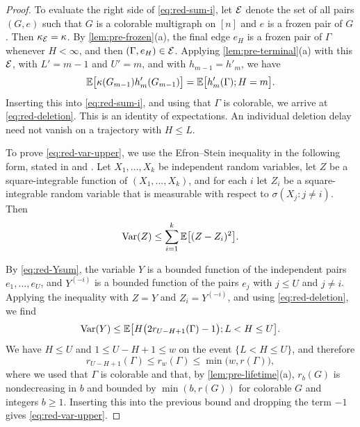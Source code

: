 \begin{proof}
To evaluate the right side of \eqref{eq:red-sum-i}, let $\mathcal E$ denote the set of all pairs $(G, e)$ such that $G$ is a colorable multigraph on $[n]$ and $e$ is a frozen pair of $G$. Then $\kappa_\mathcal E = \kappa$. By \cref{lem:pre-frozen}(a), the final edge $e_H$ is a frozen pair of $\Gamma$ whenever $H < \infty$, and then $(\Gamma, e_H) \in \mathcal E$. Applying \cref{lem:pre-terminal}(a) with this $\mathcal E$, with $L' = m - 1$ and $U' = m$, and with $h_{m - 1} = h'_m$, we have
\begin{equation*}
\mathbb E\bigl[\kappa(G_{m - 1}) h'_m(G_{m - 1})\bigr] = \mathbb E\bigl[h'_m(\Gamma); H = m\bigr].
\end{equation*}
Inserting this into \eqref{eq:red-sum-i}, and using that $\Gamma$ is colorable, we arrive at \eqref{eq:red-deletion}. This is an identity of expectations. An individual deletion delay need not vanish on a trajectory with $H \le L$.

To prove \eqref{eq:red-var-upper}, we use the Efron--Stein inequality \cite{efron1981jackknife,steele1986efron} in the following form, stated in \cite[(3.6)]{boucheron2005moment} and \cite[Theorem~3.1]{boucheron2013concentration}. Let $X_1, \dots, X_k$ be independent random variables, let $Z$ be a square-integrable function of $(X_1, \dots, X_k)$, and for each $i$ let $Z_i$ be a square-integrable random variable that is measurable with respect to $\sigma(X_j : j \ne i)$. Then
\begin{equation*}
\operatorname{Var}(Z) \le \sum_{i = 1}^{k} \mathbb E\bigl[(Z - Z_i)^2\bigr].
\end{equation*}

By \eqref{eq:red-Ysum}, the variable $Y$ is a bounded function of the independent pairs $e_1, \dots, e_U$, and $Y^{(-i)}$ is a bounded function of the pairs $e_j$ with $j \le U$ and $j \ne i$. Applying the inequality with $Z = Y$ and $Z_i = Y^{(-i)}$, and using \eqref{eq:red-deletion}, we find
\begin{equation*}
\operatorname{Var}(Y) \le \mathbb E\bigl[H \bigl(2 r_{U - H + 1}(\Gamma) - 1\bigr); L < H \le U\bigr].
\end{equation*}
We have $H \le U$ and $1 \le U - H + 1 \le w$ on the event $\{L < H \le U\}$, and therefore
\begin{equation*}
r_{U - H + 1}(\Gamma) \le r_w(\Gamma) \le \min\bigl(w, r(\Gamma)\bigr),
\end{equation*}
where we used that $\Gamma$ is colorable and that, by \cref{lem:pre-lifetime}(a), $r_b(G)$ is nondecreasing in $b$ and bounded by $\min(b, r(G))$ for colorable $G$ and integers $b \ge 1$. Inserting this into the previous bound and dropping the term $-1$ gives \eqref{eq:red-var-upper}.
\end{proof}


